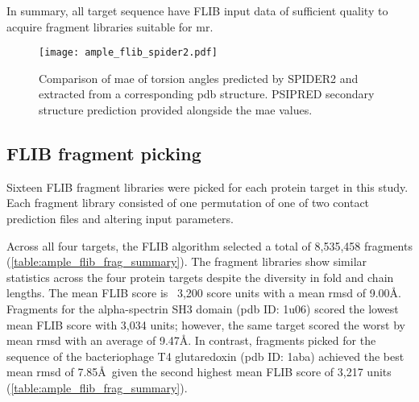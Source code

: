 In summary, all target sequence have FLIB input data of sufficient quality to acquire fragment libraries suitable for \gls{mr}.

\begin{figure}[H]
	\centering
	\texttt{[image: ample\_flib\_spider2.pdf]}
	\caption[SPIDER2 torsion angle prediction analysis of FLIB targets]{Comparison of \gls{mae} of torsion angles predicted by SPIDER2 and extracted from a corresponding \gls{pdb} structure. PSIPRED \cite{Jones1999-fi} secondary structure prediction provided alongside the \gls{mae} values.}
	\label{fig:ample_flib_spider2}
\end{figure}

\subsection{FLIB fragment picking}
Sixteen FLIB fragment libraries were picked for each protein target in this study. Each fragment library consisted of one permutation of one of two contact prediction files and altering input parameters.

Across all four targets, the FLIB algorithm selected a total of 8,535,458 fragments (\cref{table:ample_flib_frag_summary}). The fragment libraries show similar statistics across the four protein targets despite the diversity in fold and chain lengths. The mean FLIB score is ~3,200 score units with a mean \gls{rmsd} of 9.00\AA. Fragments for the alpha-spectrin SH3 domain (\gls{pdb} ID: 1u06) scored the lowest mean FLIB score with 3,034 units; however, the same target scored the worst by mean \gls{rmsd} with an average of 9.47\AA. In contrast, fragments picked for the sequence of the bacteriophage T4 glutaredoxin (\gls{pdb} ID: 1aba) achieved the best mean \gls{rmsd} of 7.85\AA\ given the second highest mean FLIB score of 3,217 units (\cref{table:ample_flib_frag_summary}).

